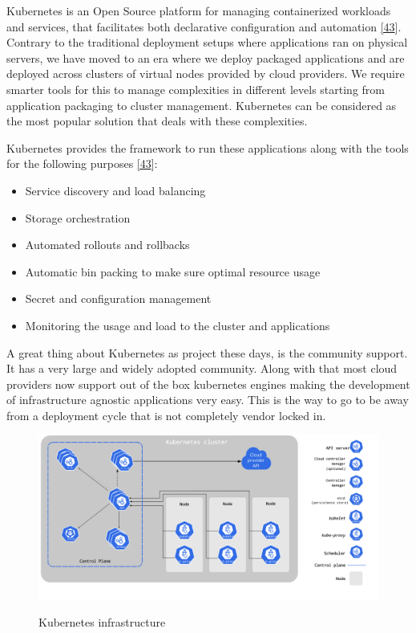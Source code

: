 \documentclass[12pt,titlepage]{article}
\begin{document}
Kubernetes is an Open Source platform for managing containerized workloads and
services, that facilitates both declarative configuration and automation \hyperref[ref:43]{[43}].
Contrary to the traditional deployment setups where applications ran on physical
servers, we have moved to an era where we deploy packaged applications and are
deployed across clusters of virtual nodes provided by cloud providers. We
require smarter tools for this to manage complexities in different levels
starting from application packaging to cluster management. Kubernetes can be
considered as the most popular solution that deals with these complexities.

Kubernetes provides the framework to run these applications along with the tools
for the following purposes \hyperref[ref:43]{[43}]:
\begin{itemize}
\item Service discovery and load balancing
\item Storage orchestration
\item Automated rollouts and rollbacks
\item Automatic bin packing to make sure optimal resource usage
\item Secret and configuration management
\item Monitoring the usage and load to the cluster and applications
\end{itemize}

A great thing about Kubernetes as project these days, is the community support.
It has a very large and widely adopted community. Along with that most cloud
providers now support out of the box kubernetes engines making the development
of infrastructure agnostic applications very easy. This is the way to go to be
away from a deployment cycle that is not completely vendor locked in.

\begin{figure}[!h]
    \caption{Kubernetes infrastructure}
    \centering
    \includegraphics[width=180mm]{./thesis_images/k8s.png}
    \label{fig:k8s}
\end{figure}
\end{document}
